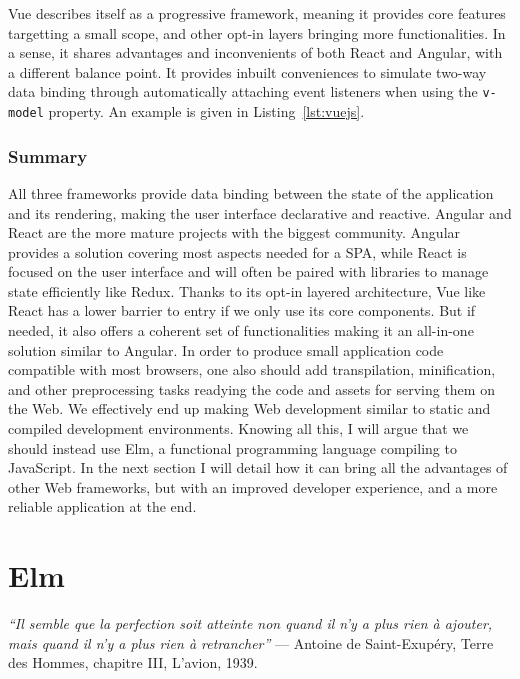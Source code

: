 Vue describes itself as a progressive framework,
meaning it provides core features targetting a small scope,
and other opt-in layers bringing more functionalities.
In a sense, it shares advantages and inconvenients of both
React and Angular, with a different balance point.
It provides inbuilt conveniences to simulate two-way data binding
through automatically attaching event listeners when using the \texttt{v-model} property.
An example is given in Listing~\ref{lst:vuejs}.




\subsubsection{Summary}%
\label{ssub:summary}

All three frameworks provide data binding between the state of the application
and its rendering, making the user interface declarative and reactive.
Angular and React are the more mature projects with
the biggest community.
Angular provides a solution covering most aspects needed for a SPA,
while React is focused on the user interface and will often be paired
with libraries to manage state efficiently like Redux.
Thanks to its opt-in layered architecture, Vue like React has a lower barrier to entry
if we only use its core components.
But if needed, it also offers a coherent set of functionalities
making it an all-in-one solution similar to Angular.
In order to produce small application code compatible with most browsers,
one also should add transpilation, minification, and other preprocessing
tasks readying the code and assets for serving them on the Web.
We effectively end up making Web development similar
to static and compiled development environments.
Knowing all this, I will argue that we should instead use Elm,
a functional programming language compiling to JavaScript.
In the next section I will detail how it can bring
all the advantages of other Web frameworks,
but with an improved developer experience,
and a more reliable application at the end.

\section{Elm}%
\label{sec:elm}

\begin{displayquote}
	\textit{``Il semble que la perfection soit atteinte non quand il n’y a plus rien à ajouter,
	mais quand il n’y a plus rien à retrancher''}
	--- Antoine de Saint-Exupéry, Terre des Hommes, chapitre III, L'avion, 1939.
\end{displayquote}

